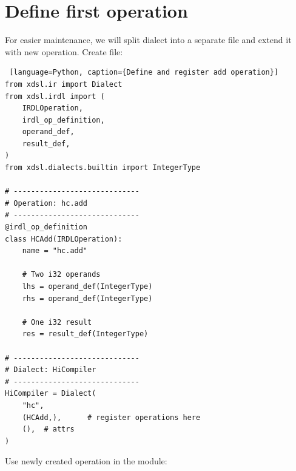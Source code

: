 \documentclass[../main.tex]{subfiles}
\begin{document}
\section{Define first operation}
For easier maintenance, we will split dialect into a separate file and extend it with new operation.
Create  file:
\begin{lstlisting} [language=Python, caption={Define and register add operation}]
from xdsl.ir import Dialect
from xdsl.irdl import (
    IRDLOperation,
    irdl_op_definition,
    operand_def,
    result_def,
)
from xdsl.dialects.builtin import IntegerType

# -----------------------------
# Operation: hc.add
# -----------------------------
@irdl_op_definition
class HCAdd(IRDLOperation):
    name = "hc.add"

    # Two i32 operands
    lhs = operand_def(IntegerType)
    rhs = operand_def(IntegerType)

    # One i32 result
    res = result_def(IntegerType)

# -----------------------------
# Dialect: HiCompiler
# -----------------------------
HiCompiler = Dialect(
    "hc",
    (HCAdd,),      # register operations here
    (),  # attrs
)
\end{lstlisting}
Use newly created operation in the module:
\end{document}
